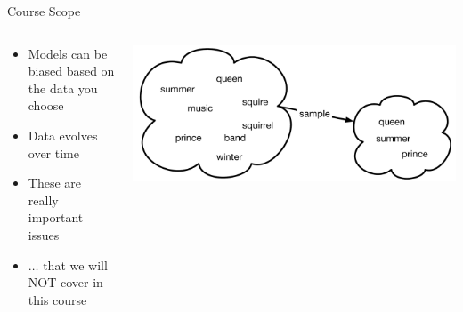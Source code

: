 \documentclass[aspectratio=169]{beamer}
\begin{document}
\begin{frame}{Course Scope}

\begin{columns}
\begin{column}{0.5\textwidth}
\begin{itemize}
\item Models can be biased based on the data you choose
\item Data evolves over time
\item These are really important issues
\item $\ldots$ that we will NOT cover in this course
\end{itemize}
\end{column}
\begin{column}{0.5\textwidth}
\includegraphics[width=1\textwidth]{lectModel1/populationSample.pdf}
\end{column}
\end{columns}
\end{frame}
\end{document}
